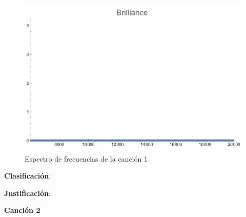 \documentclass[12pt, letterpaper]{article}
\begin{document}
\begin{figure}[H]
\begin{minipage}{.3\textwidth}
  \end{minipage}
  \begin{minipage}{0.03\textwidth}\end{minipage}
  \begin{minipage}{.3\textwidth}
    \centering
    \includegraphics[width=.9\linewidth]{imgs/Cancion1/brilliance.png}
  \end{minipage}
  \caption{Espectro de frecuencias de la canción 1}
  \label{fig:esp01}
\end{figure}

\textbf{Clasificación}: 

\textbf{Justificación}: 

\newpage

\textbf{\large{Canción 2}}
\end{document}
